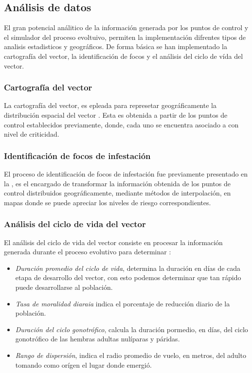 \subsection{Análisis de datos}
El gran potencial análitico de la información generada por los puntos de control y el simulador
del proceso evoltuivo, permiten la implementación difrentes tipos de analisis estadisticos y
geográficos. De forma básica se han implementado la cartografía del vector, la identificación de
focos y el análisis del ciclo de vída del vector.

\subsubsection{Cartografía del vector}
La cartografía del vector, es epleada para represetar geográficamente la distribución espacial
del vector \citep{vgomesAegis2001}. Esta es obtenida a partir de los puntos de control establecidos
previamente, donde, cada uno se encuentra asociado a con nivel de criticidad.

\subsubsection{Identificación de focos de infestación}
\label{sec:cap5-identificacion-focos}
El proceso de identificación de focos de infestación fue previamente presentado en la
, es el encargado de transformar la información obtenida de
los puntos de control distribuidos geográficamente, mediante métodos de interpolación, en mapas
donde se puede apreciar los niveles de riesgo correspondientes.

\subsubsection{Análisis del ciclo de vida del vector}
El análisis del ciclo de vida del vector consiste en procesar la información generada durante el
proceso evolutivo para determinar :

\begin{itemize}
    \item \textit{Duración promedio del ciclo de vida}, determina la duración en días de cada etapa de desarrollo del vector, con esto podemos determinar que tan rápido puede desarrollarse al población.

    \item \textit{Tasa de moralidad diaraia} indica el porcentaje de reducción diario de la población.

    \item \textit{Duración del ciclo gonotrófico}, calcula la duración pormedio, en días, del ciclo gonotrófico de las hembras adultas nulíparas y páridas.

    \item \textit{Rango de dispersión}, indica el radio promedio de vuelo, en metros, del adulto tomando como orígen el lugar donde emergió.

\end{itemize}
